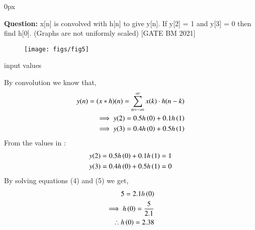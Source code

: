 \documentclass[journal,12pt,onecolumn]{IEEEtran}
\begin{document}
	\parindent 0px
	
	
	
	
	\title{}
	\author{EE23BTECH11209 - K S Ballvardhan$^{*}$
	}
	\maketitle
	\bigskip
	
	
	
	
	
	\textbf{Question:} x[n] is convolved with h[n] to give y[n]. If y[2] = 1 and y[3] = 0 then find h[0]. (Graphs are not uniformly scaled) \hfill[GATE BM 2021]
	\begin{figure}[ht]
		\texttt{[image: figs/fig5]}
		\centering
		\label{fig: fig5}
	\end{figure}
	
	\solution
	
	\begin{table}[ht] 
		\centering
		
		\caption{input values}
		\label{tab: Table2021bm30}
	\end{table}
	By convolution we know that,
	\begin{align}
		y(n) = (x*h)(n) = \sum_{n=-\infty}^{\infty} x(k) \cdot h(n-k) \\
	\implies y(2) = 0.5h \left(0\right) + 0.1h \left(1\right) \\
	\implies y(3) = 0.4h \left(0\right) + 0.5h \left(1\right) 
	\end{align}
	From the values in :
	\begin{align}
		y(2) = 0.5h \left(0\right) + 0.1h \left(1\right) &= 1 \\
		y(3) = 0.4h \left(0\right) + 0.5h \left(1\right) &= 0
	\end{align}
	By solving equations (4) and (5) we get,
	\begin{align}
		5 = 2.1h \left(0\right) \\
	\implies h \left(0\right) = \frac {5}{2.1} \\
	\therefore h \left(0\right) = 2.38
	\end{align}
\end{document}
